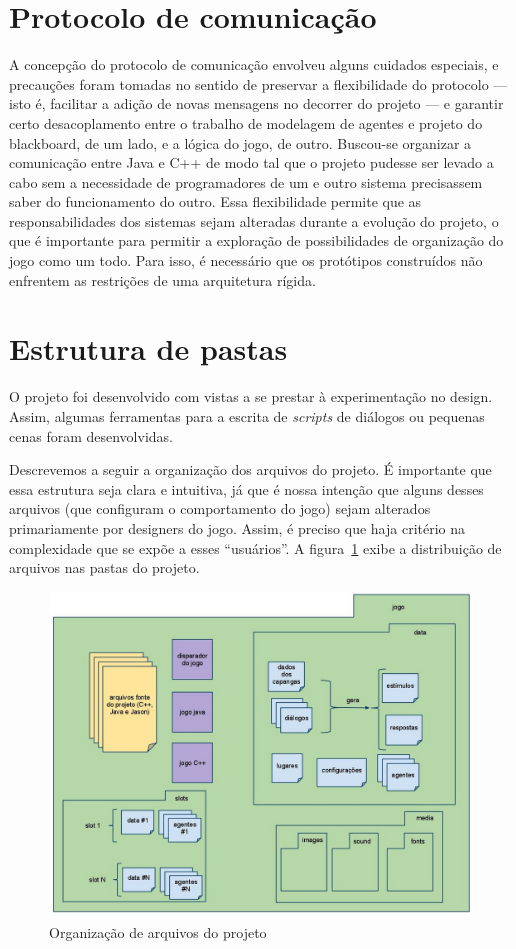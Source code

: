 \section{Protocolo de comunicação}

A concepção do protocolo de comunicação envolveu alguns cuidados especiais, e precauções foram tomadas no sentido de preservar a flexibilidade do protocolo --- isto é, facilitar a adição de novas mensagens no decorrer do projeto --- e garantir certo desacoplamento entre o trabalho de modelagem de agentes e projeto do blackboard, de um lado, e a lógica do jogo, de outro. Buscou-se organizar a comunicação entre Java e C++ de modo tal que o projeto pudesse ser levado a cabo sem a necessidade de programadores de um e outro sistema precisassem saber do funcionamento do outro. Essa flexibilidade permite que as responsabilidades dos sistemas sejam alteradas durante a evolução do projeto, o que é importante para permitir a exploração de possibilidades de organização do jogo como um todo. Para isso, é necessário que os protótipos construídos não enfrentem as restrições de uma arquitetura rígida.

\section{Estrutura de pastas}\label{estruturaPastas}

O projeto foi desenvolvido com vistas a se prestar à experimentação no
design. Assim, algumas ferramentas para a escrita de \emph{scripts} de
diálogos ou pequenas cenas foram desenvolvidas.

Descrevemos a seguir a organização dos arquivos do projeto. É
importante que essa estrutura seja clara e intuitiva, já que é nossa
intenção que alguns desses arquivos (que configuram o comportamento
do jogo) sejam alterados primariamente por designers do jogo. Assim, é
preciso que haja critério na complexidade que se expõe a esses
``usuários''. A figura~\ref{fig:estrut-arquiv} exibe a distribuição de arquivos nas pastas do projeto.  

\begin{figure}
\centering
\includegraphics[width=\textwidth]{figuras/estrutura-arquivos.jpg}
\caption{Organização de arquivos do projeto}
\label{fig:estrut-arquiv}
\end{figure}


